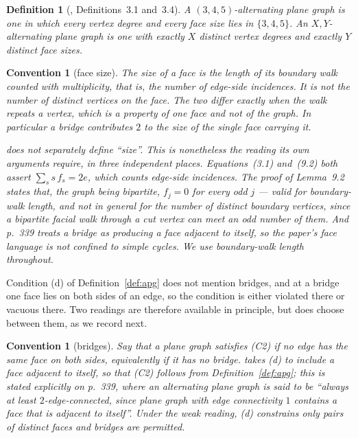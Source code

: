 \documentclass{baustms}
\theoremstyle{cupthm}
\theoremstyle{cupdefn}
\newtheorem{definition}[theorem]{Definition}
\newtheorem{convention}[theorem]{Convention}
\theoremstyle{cuprem}
\begin{document}
\begin{definition}[\cite{AHSSV2015}, Definitions~3.1 and~3.4]
A $(3,4,5)$-alternating plane graph is one in which every vertex degree and
every face size lies in $\{3,4,5\}$. An \emph{$X,Y$-alternating plane graph} is
one with exactly $X$ distinct vertex degrees and exactly $Y$ distinct face
sizes.
\end{definition}

\begin{convention}[face size]\label{conv:c1}
The \emph{size} of a face is the length of its boundary walk counted with
multiplicity, that is, the number of edge-side incidences. It is not the number
of distinct vertices on the face. The two differ exactly when the walk repeats a
vertex, which is a property of one face and not of the graph. In particular a
bridge contributes $2$ to the size of the single face carrying it.

\cite{AHSSV2015} does not separately define ``size''. This is nonetheless the
reading its own arguments require, in three independent places. Equations~(3.1)
and~(9.2) both assert $\sum_s s\,f_s = 2e$, which counts edge-side incidences.
The proof of Lemma~9.2 states that, the graph being bipartite, $f_j = 0$ for
every odd $j$ --- valid for boundary-walk length, and \emph{not} in general for
the number of distinct boundary vertices, since a bipartite facial walk through
a cut vertex can meet an odd number of them. And p.~339 treats a bridge as
producing a face adjacent to itself, so the paper's face language is not
confined to simple cycles. We use boundary-walk length throughout.
\end{convention}

Condition (d) of Definition~\ref{def:apg} does not mention bridges, and at a
bridge one face lies on both sides of an edge, so the condition is either
violated there or vacuous there. Two readings are therefore available in
principle, but \cite{AHSSV2015} does choose between them, as we record next.

\begin{convention}[bridges]\label{conv:c2}
Say that a plane graph satisfies \emph{(C2)} if no edge has the same face on
both sides, equivalently if it has no bridge. \cite{AHSSV2015} takes (d) to
include a face adjacent to itself, so that (C2) follows from
Definition~\ref{def:apg}; this is stated explicitly on p.~339, where an
alternating plane graph is said to be ``always at least $2$-edge-connected,
since plane graph with edge connectivity $1$ contains a face that is adjacent to
itself''. Under the \emph{weak reading}, (d) constrains only pairs of distinct
faces and bridges are permitted.
\end{convention}
\end{document}
